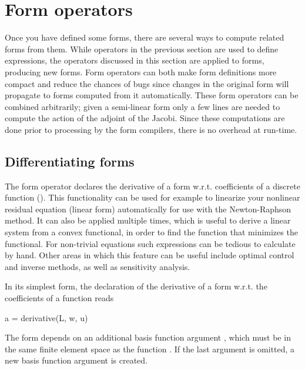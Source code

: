 \section{Form operators}
\label{ufl:sec:formtransformations}

Once you have defined some forms, there are several ways to compute
related forms from them.  While operators in the previous section are
used to define expressions, the operators discussed in this section are
applied to forms, producing new forms.  Form operators can both make form
definitions more compact and reduce the chances of bugs since changes in
the original form will propagate to forms computed from it automatically.
These form operators can be combined arbitrarily; given a semi-linear
form only a few lines are needed to compute the action of the adjoint
of the Jacobi.  Since these computations are done prior to processing
by the form compilers, there is no overhead at run-time.

\subsection{Differentiating forms}
\label{ufl:sec:derivative}

The form operator  declares the derivative of a form
w.r.t. coefficients of a discrete function ().  This
functionality can be used for example to linearize your nonlinear residual
equation (linear form) automatically for use with the Newton-Raphson
method.  It can also be applied multiple times, which is useful to
derive a linear system from a convex functional, in order to find the
function that minimizes the functional.  For non-trivial equations such
expressions can be tedious to calculate by hand.  Other areas in which
this feature can be useful include optimal control and inverse methods,
as well as sensitivity analysis.

In its simplest form, the declaration of the derivative of a form 
w.r.t. the coefficients of a function  reads
\begin{uflcode}
a = derivative(L, w, u)
\end{uflcode}
The form  depends on an additional basis function argument ,
which must be in the same finite element space as the function .
If the last argument is omitted, a new basis function argument is created.

